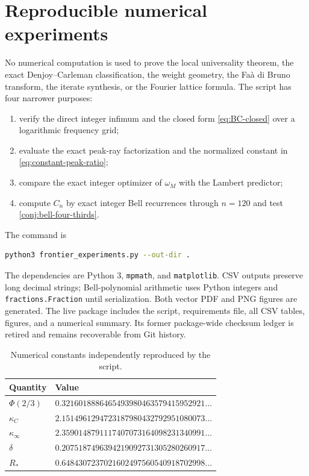 \documentclass[11pt,a4paper]{article}
\theoremstyle{definition}
\theoremstyle{remark}
\begin{document}
\section{Reproducible numerical experiments}
\label{sec:numerics}

No numerical computation is used to prove the local universality theorem, the exact
Denjoy--Carleman classification, the weight geometry, the Fa\`a di Bruno transform,
the iterate synthesis, or the Fourier lattice formula.  The script
 has four narrower purposes:

\begin{enumerate}[label=(\roman*)]
\item verify the direct integer infimum and the closed form
\eqref{eq:BC-closed} over a logarithmic frequency grid;
\item evaluate the exact peak-ray factorization and the normalized constant in
\eqref{eq:constant-peak-ratio};
\item compare the exact integer optimizer of $\omega_M$ with the Lambert predictor;
\item compute $C_n$ by exact integer Bell recurrences through $n=120$ and test
\cref{conj:bell-four-thirds}.
\end{enumerate}

The command is
\begin{lstlisting}[language=bash]
python3 frontier_experiments.py --out-dir .
\end{lstlisting}
The dependencies are Python $3$, \texttt{mpmath}, and \texttt{matplotlib}.  CSV
outputs preserve long decimal strings; Bell-polynomial arithmetic uses Python
integers and \texttt{fractions.Fraction} until serialization.  Both vector PDF and
PNG figures are generated.  The live package includes the script, requirements
file, all CSV tables, figures, and a numerical summary.  Its former package-wide
checksum ledger is retired and remains recoverable from Git history.

\begin{table}[htbp]
\centering
\caption{Numerical constants independently reproduced by the script.}
\label{tab:constants}
\begin{tabular}{ll}
\toprule
Quantity & Value \\
\midrule
$\Phi(2/3)$ & $0.3216018886465493980463579415952921\ldots$ \\
$\kappa_C$ & $2.1514961294723187980432792951080073\ldots$ \\
$\kappa_\infty$ & $2.3590148791117407073164098231340991\ldots$ \\
$\delta$ & $0.2075187496394219092731305280260917\ldots$ \\
$R_*$ & $0.6484307237021602497560540918702998\ldots$ \\
\bottomrule
\end{tabular}
\end{table}
\end{document}
